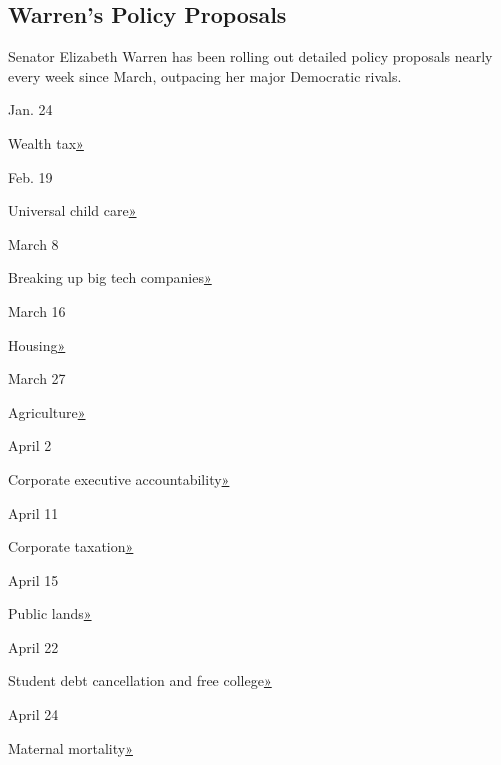 \hypertarget{warrens-policy-proposals}{%
\subsection{Warren's Policy Proposals}\label{warrens-policy-proposals}}

Senator Elizabeth Warren has been rolling out detailed policy proposals
nearly every week since March, outpacing her major Democratic rivals.

Jan. 24

Wealth tax\href{https://elizabethwarren.com/ultra-millionaire-tax/}{»}

Feb. 19

Universal child
care\href{https://medium.com/@teamwarren/my-plan-for-universal-child-care-762535e6c20a}{»}

March 8

Breaking up big tech
companies\href{https://medium.com/@teamwarren/heres-how-we-can-break-up-big-tech-9ad9e0da324c}{»}

March 16

Housing\href{https://medium.com/@teamwarren/my-housing-plan-for-america-20038e19dc26}{»}

March 27

Agriculture\href{https://medium.com/@teamwarren/leveling-the-playing-field-for-americas-family-farmers-823d1994f067}{»}

April 2

Corporate executive
accountability\href{https://www.washingtonpost.com/opinions/elizabeth-warren-its-time-to-scare-corporate-america-straight/2019/04/02/ca464ab0-5559-11e9-8ef3-fbd41a2ce4d5_story.html?utm_term=.d08b4f4b871f}{»}

April 11

Corporate
taxation\href{https://medium.com/@teamwarren/im-proposing-a-big-new-idea-the-real-corporate-profits-tax-29dde7c960d}{»}

April 15

Public
lands\href{https://medium.com/@teamwarren/my-plan-for-public-lands-e4be1d88a01c}{»}

April 22

Student debt cancellation and free
college\href{https://medium.com/@teamwarren/im-calling-for-something-truly-transformational-universal-free-public-college-and-cancellation-of-a246cd0f910f}{»}

April 24

Maternal
mortality\href{https://twitter.com/ewarren/status/1121164657455136768}{»}


